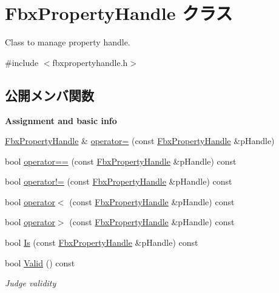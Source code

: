 \hypertarget{class_fbx_property_handle}{}\section{Fbx\+Property\+Handle クラス}
\label{class_fbx_property_handle}


Class to manage property handle.  




{\ttfamily \#include $<$fbxpropertyhandle.\+h$>$}

\subsection*{公開メンバ関数}
\begin{Indent}\textbf{ Assignment and basic info}\par
\begin{DoxyCompactItemize}
\item 
\hyperlink{class_fbx_property_handle}{Fbx\+Property\+Handle} \& \hyperlink{class_fbx_property_handle_a23a41629f6fe1629b9752ea42615b010}{operator=} (const \hyperlink{class_fbx_property_handle}{Fbx\+Property\+Handle} \&p\+Handle)
\item 
bool \hyperlink{class_fbx_property_handle_aee6f973f1c78f4dbd6f98fd4f3766016}{operator==} (const \hyperlink{class_fbx_property_handle}{Fbx\+Property\+Handle} \&p\+Handle) const
\item 
bool \hyperlink{class_fbx_property_handle_a551b2ce6d554279f23f11a1a1bbdc935}{operator!=} (const \hyperlink{class_fbx_property_handle}{Fbx\+Property\+Handle} \&p\+Handle) const
\item 
bool \hyperlink{class_fbx_property_handle_a6035a62865028477a5352726c6682f79}{operator$<$} (const \hyperlink{class_fbx_property_handle}{Fbx\+Property\+Handle} \&p\+Handle) const
\item 
bool \hyperlink{class_fbx_property_handle_add1ef2cecd4a73e427d8d8713d776ccd}{operator$>$} (const \hyperlink{class_fbx_property_handle}{Fbx\+Property\+Handle} \&p\+Handle) const
\item 
bool \hyperlink{class_fbx_property_handle_ab709acfb7bc25ce784c4453b3004a730}{Is} (const \hyperlink{class_fbx_property_handle}{Fbx\+Property\+Handle} \&p\+Handle) const
\item 
bool \hyperlink{class_fbx_property_handle_ae9e85fda97a40a94361ed91c6127f5a1}{Valid} () const
\begin{DoxyCompactList}\small\item\em Judge validity \end{DoxyCompactList}\item 

\end{DoxyCompactItemize}
\end{Indent}
